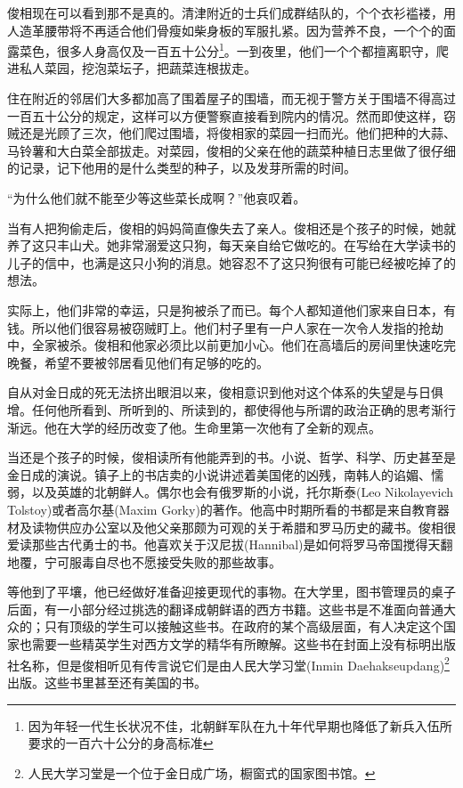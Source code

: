 俊相现在可以看到那不是真的。清津附近的士兵们成群结队的，个个衣衫褴褛，用人造革腰带将不再适合他们骨瘦如柴身板的军服扎紧。因为营养不良，一个个的面露菜色，很多人身高仅及一百五十公分\footnote{因为年轻一代生长状况不佳，北朝鲜军队在九十年代早期也降低了新兵入伍所要求的一百六十公分的身高标准}。一到夜里，他们一个个都擅离职守，爬进私人菜园，挖泡菜坛子，把蔬菜连根拔走。

住在附近的邻居们大多都加高了围着屋子的围墙，而无视于警方关于围墙不得高过一百五十公分的规定，这样可以方便警察直接看到院内的情况。然而即使这样，窃贼还是光顾了三次，他们爬过围墙，将俊相家的菜园一扫而光。他们把种的大蒜、马铃薯和大白菜全部拔走。对菜园，俊相的父亲在他的蔬菜种植日志里做了很仔细的记录，记下他用的是什么类型的种子，以及发芽所需的时间。

“为什么他们就不能至少等这些菜长成啊？”他哀叹着。

当有人把狗偷走后，俊相的妈妈简直像失去了亲人。俊相还是个孩子的时候，她就养了这只丰山犬。她非常溺爱这只狗，每天亲自给它做吃的。在写给在大学读书的儿子的信中，也满是这只小狗的消息。她容忍不了这只狗很有可能已经被吃掉了的想法。

实际上，他们非常的幸运，只是狗被杀了而已。每个人都知道他们家来自日本，有钱。所以他们很容易被窃贼盯上。他们村子里有一户人家在一次令人发指的抢劫中，全家被杀。俊相和他家必须比以前更加小心。他们在高墙后的房间里快速吃完晚餐，希望不要被邻居看见他们有足够的吃的。

自从对金日成的死无法挤出眼泪以来，俊相意识到他对这个体系的失望是与日俱增。任何他所看到、所听到的、所读到的，都使得他与所谓的政治正确的思考渐行渐远。他在大学的经历改变了他。生命里第一次他有了全新的观点。

当还是个孩子的时候，俊相读所有他能弄到的书。小说、哲学、科学、历史甚至是金日成的演说。镇子上的书店卖的小说讲述着美国佬的凶残，南韩人的谄媚、懦弱，以及英雄的北朝鲜人。偶尔也会有俄罗斯的小说，托尔斯泰(Leo Nikolayevich Tolstoy)或者高尔基(Maxim Gorky)的著作。他高中时期所看的书都是来自教育器材及读物供应办公室以及他父亲那颇为可观的关于希腊和罗马历史的藏书。俊相很爱读那些古代勇士的书。他喜欢关于汉尼拔(Hannibal)是如何将罗马帝国搅得天翻地覆，宁可服毒自尽也不愿接受失败的那些故事。

等他到了平壤，他已经做好准备迎接更现代的事物。在大学里，图书管理员的桌子后面，有一小部分经过挑选的翻译成朝鲜语的西方书籍。这些书是不准面向普通大众的；只有顶级的学生可以接触这些书。在政府的某个高级层面，有人决定这个国家也需要一些精英学生对西方文学的精华有所瞭解。这些书在封面上没有标明出版社名称，但是俊相听见有传言说它们是由人民大学习堂(Inmin Daehakseupdang)\footnote{人民大学习堂是一个位于金日成广场，橱窗式的国家图书馆。}出版。这些书里甚至还有美国的书。

